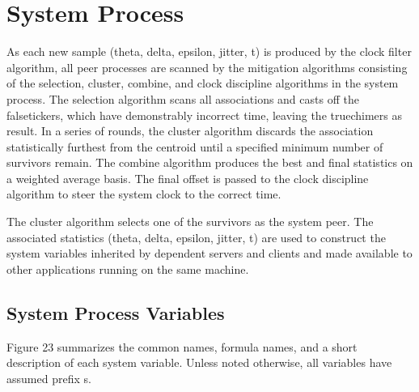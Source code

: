 \chapter{System Process}

As each new sample (theta, delta, epsilon, jitter, t) is produced by
the clock filter algorithm, all peer processes are scanned by the
mitigation algorithms consisting of the selection, cluster, combine,
and clock discipline algorithms in the system process.  The selection
algorithm scans all associations and casts off the falsetickers,
which have demonstrably incorrect time, leaving the truechimers as
result.  In a series of rounds, the cluster algorithm discards the
association statistically furthest from the centroid until a
specified minimum number of survivors remain.  The combine algorithm
produces the best and final statistics on a weighted average basis.
The final offset is passed to the clock discipline algorithm to steer
the system clock to the correct time.

The cluster algorithm selects one of the survivors as the system
peer.  The associated statistics (theta, delta, epsilon, jitter, t)
are used to construct the system variables inherited by dependent
servers and clients and made available to other applications running
on the same machine.

\section{System Process Variables}

Figure 23 summarizes the common names, formula names, and a short
description of each system variable.  Unless noted otherwise, all
variables have assumed prefix s.

